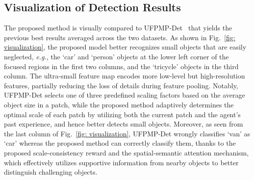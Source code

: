 \documentclass[letterpaper]{article} %
\def \eg {\emph{e.g.}}
\begin{document}
\subsection{Visualization of Detection Results}
\label{ssec:visualization}
The proposed method is visually compared %
to UFPMP-Det~\cite{Huang_2022_UFPMP} that yields the previous best results averaged across the two datasets. As shown in Fig.~\ref{fig: visualization}, the proposed model better recognizes small objects that are easily neglected, \eg, the `car' and `person' objects at the lower left corner of the focused regions in the first two columns, and the `tricycle' objects in the third column. The ultra-small feature map encodes more low-level but high-resolution features, partially reducing the %
loss of details during feature pooling. %
Notably, UFPMP-Det selects one of three predefined scaling factors based on the average object size in a patch, while the proposed method adaptively determines the optimal scale of each patch by utilizing both the current patch and %
the agent's past experience, and hence better detects small objects. Moreover, as seen from the last column of Fig.~\ref{fig: visualization}, UFPMP-Det wrongly classifies 
`van' as `car' whereas the proposed method can correctly classify them, thanks to the proposed scale-consistency reward and the spatial-semantic attention mechanism, which %
effectively utilizes supportive information from nearby objects to better distinguish challenging objects. 
\end{document}
